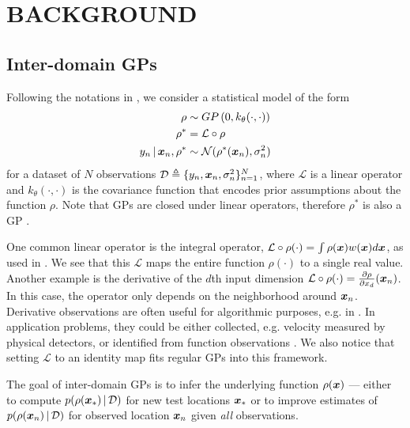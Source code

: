 \section{BACKGROUND}
\label{sec:background}

\subsection{Inter-domain GPs}

Following the notations in \citet{van2020framework},
we consider a statistical model of the form
\begin{align}
  \rho &\sim GP\left( 0, k_{\theta}(\cdot, \cdot) \right) \\
  \rho^* &= \mathcal{L} \circ \rho \\
  y_n \,|\, \boldsymbol{x}_n, \rho^* &\sim \mathcal{N}(\rho^*(\boldsymbol{x}_n), \sigma_n^2)
\end{align}
for a dataset of $N$ observations $\mathcal{D} \triangleq \{ y_n, \boldsymbol{x}_n,
\sigma_n^2 \}_{n=1}^N$, where $\mathcal{L}$ is a linear operator
and $k_{\theta}(\cdot, \cdot)$ is the covariance function that encodes prior assumptions
about the function $\rho$. %
Note that GPs are closed under linear operators,
therefore $\rho^*$ is also a GP \citep{rasmussen2006gaussian}.

One common linear operator is the integral operator,
$\mathcal{L} \circ \rho (\cdot)  = \int \rho( \boldsymbol{x}) w (\boldsymbol{x}) d \boldsymbol{x}$,
as used in \citet{lazaro2009inter}.
We see that this $\mathcal{L}$ maps the entire function
$\rho (\cdot)$ to a single real value.
Another example is the derivative of the $d$th input dimension
$\mathcal{L} \circ \rho (\cdot) = \frac{ \partial \rho }{\partial x_d } (\boldsymbol{x}_n)$.
In this case, the operator only depends on the neighborhood around $\boldsymbol{x}_n$.
Derivative observations are often useful for algorithmic purposes, e.g. in \citet{riihimaki2010gaussian}.
In application problems, they
could be either collected, e.g.  velocity measured by physical detectors,
or identified from function observations \citep{solak2003derivative}.
We also notice that setting $\mathcal{L}$ to an identity map fits
 regular GPs into this framework.

The goal of inter-domain GPs is to infer the underlying
function $\rho(\boldsymbol{x})$ --- either to compute $p(\rho(\boldsymbol{x}_*) \,|\, \mathcal{D})$
for new test locations $\boldsymbol{x}_*$ or to improve estimates of $p(\rho(\boldsymbol{x}_n) \,|\,
\mathcal{D})$ for observed location $\boldsymbol{x}_n$ given \emph{all} observations.


